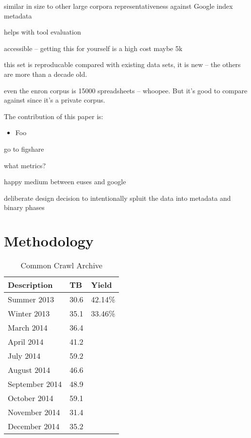 \documentclass[conference]{IEEEtran}
\begin{document}
similar in size to other large corpora
representativeness against Google index
metadata

helps with tool evaluation

accessible -- getting this for yourself is a high cost maybe 5k

this set is reproducable
compared with existing data sets, it is new -- the others are more than a decade old.

even the enron corpus is 15000 spreadsheets -- whoopee. But it's good to compare against since it's a private corpus.

The contribution of this paper is:

\begin{itemize}
\item Foo
\end{itemize}

go to figshare


what metrics?

happy medium between euses and google

deliberate design decision to 
intentionally spluit the data into metadata and binary phases

\section{Methodology}

\begin{table}[!t]
\caption{Common Crawl Archive\label{tab:ccrawl}}
\centering
\begin{tabular}{lll}
\toprule
Description & TB & Yield\\
\midrule
Summer 2013 & 30.6 & 42.14\%\\
Winter 2013 & 35.1 & 33.46\% \\
March 2014 & 36.4 & \\
April 2014 & 41.2 & \\
July 2014 & 59.2 & \\
August 2014 & 46.6 & \\
September 2014 & 48.9 & \\
October 2014 & 59.1 & \\
November 2014 & 31.4 & \\
December 2014 & 35.2 & \\
\bottomrule
\end{tabular}
\end{table}
\end{document}

